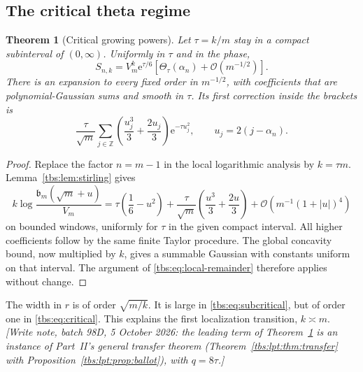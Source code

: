 \documentclass[11pt,a4paper]{article}
\numberwithin{equation}{section}
\newtheorem{theorem}{Theorem}[section]
\theoremstyle{definition}
\newcommand{\Z}{\mathbb Z}
\newcommand{\bcont}{\mathfrak b}
\newcommand{\ee}{\mathrm e}
\newcommand{\OO}{\mathcal O}
\begin{document}
\subsection{The critical theta regime}
\begin{theorem}[Critical growing powers]\label{tbs:thm:critical}
Let $\tau=k/m$ stay in a compact subinterval of $(0,\infty)$. Uniformly
in $\tau$ and in the phase,
\begin{equation}\label{tbs:eq:critical}
 S_{n,k}=V_m^k\ee^{\tau/6}
 \left[\Theta_\tau(\alpha_n)+\OO(m^{-1/2})\right].
\end{equation}
There is an expansion to every fixed order in $m^{-1/2}$, with
coefficients that are polynomial-Gaussian sums and smooth in $\tau$.
Its first correction inside the brackets is
\begin{equation}\label{tbs:eq:critical-first}
 \frac{\tau}{\sqrt m}\sum_{j\in\Z}
 \left(\frac{u_j^3}{3}+\frac{2u_j}{3}\right)\ee^{-\tau u_j^2},
 \qquad u_j=2(j-\alpha_n).
\end{equation}
\end{theorem}
\begin{proof}
Replace the factor $n=m-1$ in the local logarithmic analysis by
$k=\tau m$. Lemma~\ref{tbs:lem:stirling} gives
\[
 k\log\frac{\bcont_m(\sqrt m+u)}{V_m}
 =\tau\left(\frac16-u^2\right)
 +\frac{\tau}{\sqrt m}\left(\frac{u^3}{3}+\frac{2u}{3}\right)
 +\OO\!\left(m^{-1}(1+|u|)^4\right)
\]
on bounded windows, uniformly for $\tau$ in the given compact interval.
All higher coefficients follow by the same finite Taylor procedure.
The global concavity bound, now multiplied by $k$, gives a summable
Gaussian with constants uniform on that interval. The argument of
\eqref{tbs:eq:local-remainder} therefore applies without change.
\end{proof}

The width in $r$ is of order $\sqrt{m/k}$. It is large in
\eqref{tbs:eq:subcritical}, but of order one in \eqref{tbs:eq:critical}.
This explains the first localization transition, $k\asymp m$.
\emph{[Write note, batch 98D, 5 October 2026: the leading term of
Theorem~\ref{tbs:thm:critical} is an instance of Part~II's general
transfer theorem (Theorem~\ref{tbs:lpt:thm:transfer} with
Proposition~\ref{tbs:lpt:prop:ballot}), with $q=8\tau$.]}
\end{document}
